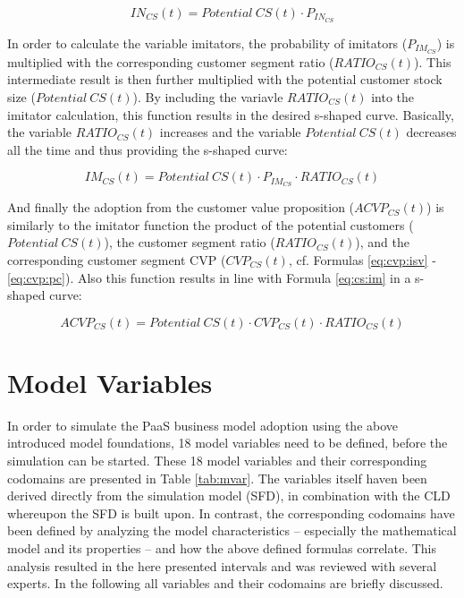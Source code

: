 \begin{equation}\label{eq:cs:in}
		IN_{CS}(t) = \mathit{Potential~CS(t)} \cdot P_{IN_{CS}}
\end{equation}

In order to calculate the variable imitators, the probability of imitators ($P_{IM_{CS}}$) is multiplied with the corresponding customer segment ratio ($RATIO_{CS}(t)$). This intermediate result is then further multiplied with the potential customer stock size ($\mathit{Potential~CS(t)}$). By including the variavle $RATIO_{CS}(t)$ into the imitator calculation, this function results in the desired s-shaped curve. Basically, the variable $RATIO_{CS}(t)$ increases and the variable $\mathit{Potential~CS(t)}$ decreases all the time and thus providing the s-shaped curve:

\begin{equation}\label{eq:cs:im}
		IM_{CS}(t) = \mathit{Potential~CS(t)} \cdot P_{IM_{CS}} \cdot RATIO_{CS}(t)
\end{equation}

And finally the adoption from the customer value proposition \linebreak ($ACVP_{CS}(t)$) is similarly to the imitator function the product of the potential customers ($\mathit{Potential~CS(t)}$), the customer segment ratio ($RATIO_{CS}(t)$), and the corresponding customer segment \ac{CVP} ($CVP_{CS}(t)$, cf. Formulas \ref{eq:cvp:isv} - \ref{eq:cvp:pc}). Also this function results in line with Formula \ref{eq:cs:im} in a s-shaped curve:

\begin{equation}\label{eq:cs:acvp}
		ACVP_{CS}(t) = \mathit{Potential~CS(t)} \cdot CVP_{CS}(t) \cdot RATIO_{CS}(t)
\end{equation}

\section{Model Variables}\label{ch:sfd:mv}

In order to simulate the \ac{PaaS} business model adoption using the above introduced model foundations, 18 model variables need to be defined, before the simulation can be started. These 18 model variables and their corresponding codomains are presented in Table \ref{tab:mvar}. The variables itself haven been derived directly from the simulation model (\ac{SFD}), in combination with the \ac{CLD} whereupon the \ac{SFD} is built upon. In contrast, the corresponding codomains have been defined by analyzing the model characteristics -- especially the mathematical model and its properties -- and how the above defined formulas correlate. This analysis resulted in the here presented intervals and was reviewed with several experts. In the following all variables and their codomains are briefly discussed.

